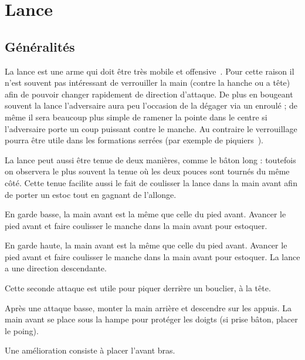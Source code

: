 \chapter{Lance}


\section{Généralités}

La lance est une arme qui doit être très mobile et offensive~\footnotemark{}.%
Pour cette raison il n'est souvent pas intéressant de verrouiller la main (contre la hanche ou a tête) afin de pouvoir changer rapidement de direction d'attaque.
De plus en bougeant souvent la lance l'adversaire aura peu l'occasion de la dégager via un enroulé ; de même il sera beaucoup plus simple de ramener la pointe dans le centre si l'adversaire porte un coup puissant contre le manche.
Au contraire le verrouillage pourra être utile dans les formations serrées (par exemple de piquiers~\footnotemark).

La lance peut aussi être tenue de deux manières, comme le bâton long : toutefois on observera le plus souvent la tenue où les deux pouces sont tournés du même côté.
Cette tenue facilite aussi le fait de coulisser la lance dans la main avant afin de porter un estoc tout en gagnant de l'allonge.



\begin{coup}
En garde basse, la main avant est la même que celle du pied avant.
Avancer le pied avant et faire coulisser le manche dans la main avant pour estoquer.
\end{coup}


\begin{coup}
En garde haute, la main avant est la même que celle du pied avant.
Avancer le pied avant et faire coulisser le manche dans la main avant pour estoquer.
La lance a une direction descendante.
\end{coup}


Cette seconde attaque est utile pour piquer derrière un bouclier, à la tête.


\begin{technique}
Après une attaque basse, monter la main arrière et descendre sur les appuis.
La main avant se place sous la hampe pour protéger les doigts (si prise bâton, placer le poing).

Une amélioration consiste à placer l'avant bras.
\end{technique}


